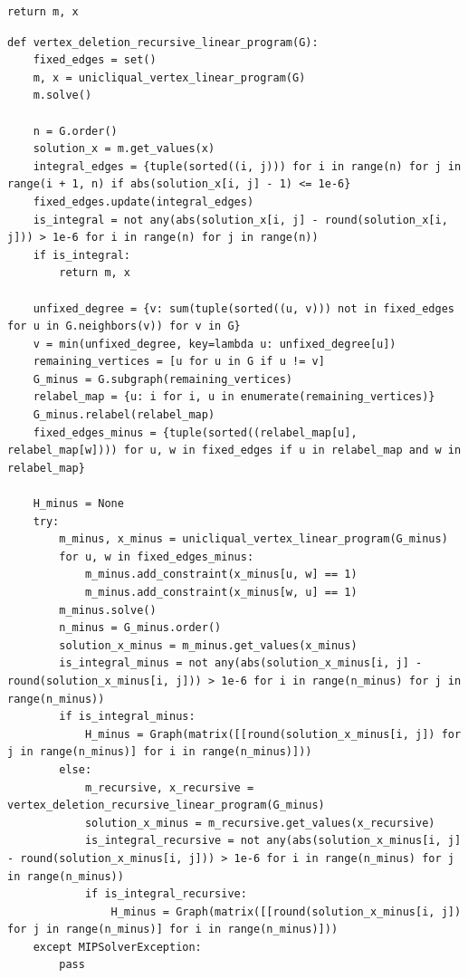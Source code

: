 \begin{lstlisting}[style=python, caption={Vertex Deletion Linear Program.}, label={lst::vertex_deletion_linear_program}]
    return m, x
\end{lstlisting}

\begin{lstlisting}[style=python, caption={Recursive Vertex Deletion Linear Program.}, label={lst::vertex_deletion_recursive_linear_program}]
def vertex_deletion_recursive_linear_program(G):
    fixed_edges = set()
    m, x = unicliqual_vertex_linear_program(G)
    m.solve()

    n = G.order()
    solution_x = m.get_values(x)
    integral_edges = {tuple(sorted((i, j))) for i in range(n) for j in range(i + 1, n) if abs(solution_x[i, j] - 1) <= 1e-6}
    fixed_edges.update(integral_edges)
    is_integral = not any(abs(solution_x[i, j] - round(solution_x[i, j])) > 1e-6 for i in range(n) for j in range(n))
    if is_integral:
        return m, x

    unfixed_degree = {v: sum(tuple(sorted((u, v))) not in fixed_edges for u in G.neighbors(v)) for v in G}
    v = min(unfixed_degree, key=lambda u: unfixed_degree[u])
    remaining_vertices = [u for u in G if u != v]
    G_minus = G.subgraph(remaining_vertices)
    relabel_map = {u: i for i, u in enumerate(remaining_vertices)}
    G_minus.relabel(relabel_map)
    fixed_edges_minus = {tuple(sorted((relabel_map[u], relabel_map[w]))) for u, w in fixed_edges if u in relabel_map and w in relabel_map}

    H_minus = None
    try:
        m_minus, x_minus = unicliqual_vertex_linear_program(G_minus)
        for u, w in fixed_edges_minus:
            m_minus.add_constraint(x_minus[u, w] == 1)
            m_minus.add_constraint(x_minus[w, u] == 1)
        m_minus.solve()
        n_minus = G_minus.order()
        solution_x_minus = m_minus.get_values(x_minus)
        is_integral_minus = not any(abs(solution_x_minus[i, j] - round(solution_x_minus[i, j])) > 1e-6 for i in range(n_minus) for j in range(n_minus))
        if is_integral_minus:
            H_minus = Graph(matrix([[round(solution_x_minus[i, j]) for j in range(n_minus)] for i in range(n_minus)]))
        else:
            m_recursive, x_recursive = vertex_deletion_recursive_linear_program(G_minus)
            solution_x_minus = m_recursive.get_values(x_recursive)
            is_integral_recursive = not any(abs(solution_x_minus[i, j] - round(solution_x_minus[i, j])) > 1e-6 for i in range(n_minus) for j in range(n_minus))
            if is_integral_recursive:
                H_minus = Graph(matrix([[round(solution_x_minus[i, j]) for j in range(n_minus)] for i in range(n_minus)]))
    except MIPSolverException:
        pass


\end{lstlisting}
